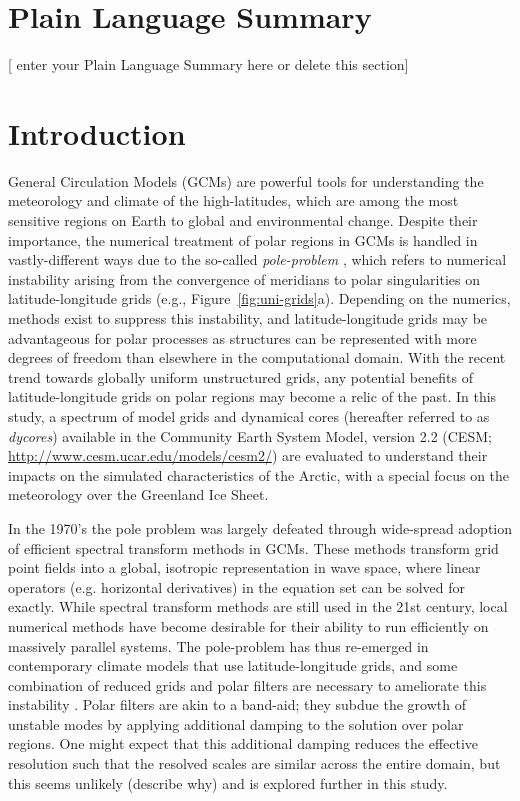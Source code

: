 \documentclass[draft]{agujournal2019}
\begin{document}
\section*{Plain Language Summary}
[ enter your Plain Language Summary here or delete this section]


%
%

\section{Introduction}

General Circulation Models (GCMs) are powerful tools for understanding the meteorology and climate of the high-latitudes, which are among the most sensitive regions on Earth to global and environmental change. Despite their importance, the numerical treatment of polar regions in GCMs is handled in vastly-different ways due to the so-called \textit{pole-problem} \cite{W2007JMSJ}, which refers to numerical instability arising from the convergence of meridians to polar singularities on latitude-longitude grids (e.g., Figure~\ref{fig:uni-grids}a). Depending on the numerics, methods exist to suppress this instability, and latitude-longitude grids may be advantageous for polar processes as structures can be represented with more degrees of freedom than elsewhere in the computational domain. With the recent trend towards globally uniform unstructured grids, any potential benefits of latitude-longitude grids on polar regions may become a relic of the past. In this study, a spectrum of model grids and dynamical cores (hereafter referred to as \textit{dycores}) available in the Community Earth System Model, version 2.2 (CESM; \url{http://www.cesm.ucar.edu/models/cesm2/}) are evaluated to understand their impacts on the simulated characteristics of the Arctic, with a special focus on the meteorology over the Greenland Ice Sheet.

In the 1970's the pole problem was largely defeated through wide-spread adoption of efficient spectral transform methods in GCMs. These methods transform grid point fields into a global, isotropic representation in wave space, where linear operators (e.g. horizontal derivatives) in the equation set can be solved for exactly. While spectral transform methods are still used in the 21st century, local numerical methods have become desirable for their ability to run efficiently on massively parallel systems. The pole-problem has thus re-emerged in contemporary climate models that use latitude-longitude grids, and some combination of reduced grids and polar filters are necessary to ameliorate this instability \cite{JW2010LNCSE}. Polar filters are akin to a band-aid; they subdue the growth of unstable modes by applying additional damping to the solution over polar regions. One might expect that this additional damping reduces the effective resolution such that the resolved scales are similar across the entire domain, but this seems unlikely (describe why) and is explored further in this study.
\end{document}
